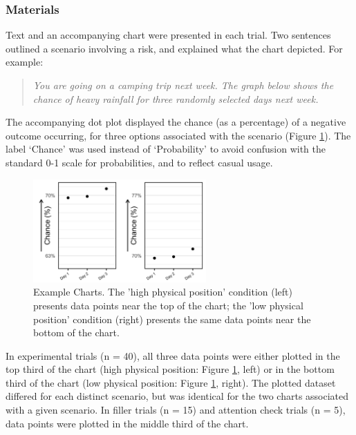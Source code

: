 \documentclass[journal]{vgtc}                %
\begin{document}
\hypertarget{materials}{%
\subsubsection{Materials}\label{materials}}

Text and an accompanying chart were presented in each trial. Two
sentences outlined a scenario involving a risk, and explained what the
chart depicted. For example:

\begin{quote}
\emph{You are going on a camping trip next week. The graph below shows the
chance of heavy rainfall for three randomly selected days next week.}
\end{quote}

The accompanying dot plot displayed the chance (as a percentage) of a
negative outcome occurring, for three options associated with the
scenario (Figure \ref{fig:example-charts}). The label `Chance' was used
instead of `Probability' to avoid confusion with the standard 0-1 scale
for probabilities, and to reflect casual usage.

\begin{figure}
\includegraphics[width=250px]{position_magnitude_files/figure-latex/example-charts-1} \caption{Example Charts. The 'high physical position' condition (left) presents data points near the top of the chart; the 'low physical position' condition (right) presents the same data points near the bottom of the chart.}\label{fig:example-charts}
\end{figure}

In experimental trials (n = 40), all three data points were either
plotted in the top third of the chart (high physical position: Figure
\ref{fig:example-charts}, left) or in the bottom third of the chart
(low physical position: Figure \ref{fig:example-charts}, right). The
plotted dataset differed for each distinct scenario, but was identical
for the two charts associated with a given scenario. In filler trials (n
= 15) and attention check trials (n = 5), data points were plotted in
the middle third of the chart.
\end{document}
